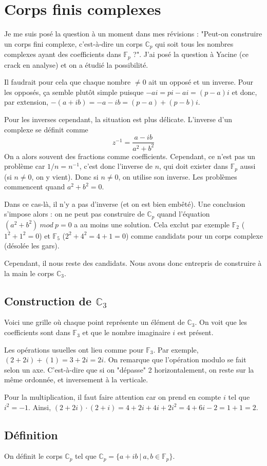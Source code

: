 \documentclass[10pt,a4paper]{book}
\newcommand{\F}{\mathbb{F}}
\newcommand{\C}{\mathbb{C}}
\begin{document}
\chapter{Corps finis complexes}
Je me suis posé la question à un moment dans mes révisions : "Peut-on construire un corps fini complexe, c'est-à-dire un corps $\C_p$ qui soit tous les nombres complexes ayant des coefficients dans $\F_p$ ?". J'ai posé la question à Yacine (ce crack en analyse) et on a étudié la possibilité. \par 
Il faudrait pour cela que chaque nombre $\neq 0$ ait un opposé et un inverse. Pour les opposés, ça semble plutôt simple puisque $-ai = pi-ai = (p-a)i$ et donc, par extension, $-(a+ib)=-a-ib=(p-a)+(p-b)i$.\par 
Pour les inverses cependant, la situation est plus délicate. L'inverse d'un complexe se définit comme
\[z^{-1}=\frac{a-ib}{a^2+b^2}\]
On a alors souvent des fractions comme coefficients. Cependant, ce n'est pas un problème car $1/n = n^{-1}$, c'est donc l'inverse de $n$, qui doit exister dans $\F_p$ aussi (si $n\neq 0$, on y vient). Donc si $n\neq 0$, on utilise son inverse. Les problèmes commencent quand $a^2+b^2=0$.\par
Dans ce cas-là, il n'y a pas d'inverse (et on est bien embêté). Une conclusion s'impose alors : on ne peut pas construire de $\C_p$ quand l'équation $(a^2+b^2)\ mod\ p=0$ a au moins une solution. Cela exclut par exemple $\F_2$ ($1^2+1^2=0$) et $\F_5$ ($2^2+4^2=4+1=0$) comme candidats pour un corps complexe (désolée les gars). \par 
Cependant, il nous reste des candidats. Nous avons donc entrepris de construire à la main le corps $\C_3$.
\section{Construction de $\C_3$}
\begin{center}
\end{center}\par 
Voici une grille où chaque point représente un élément de $\C_3$. On voit que les coefficients sont dans $\F_3$ et que le nombre imaginaire $i$ est présent.\par 
Les opérations usuelles ont lieu comme pour $\F_3$. Par exemple, $(2+2i)+(1)=3+2i=2i$. On remarque que l'opération modulo se fait selon un axe. C'est-à-dire que si on "dépasse" 2 horizontalement, on reste sur la même ordonnée, et inversement à la verticale. \par 
Pour la multiplication, il faut faire attention car on prend en compte $i$ tel que $i^2=-1$. Ainsi, $(2+2i)\cdot(2+i)=4+2i+4i+2i^2=4+6i-2=1+1=2$.

\section{Définition}
On définit le corps $\C_p$ tel que $\C_p = \{a+ib\ |\ a,b\in\F_p\}$. 
\end{document}
